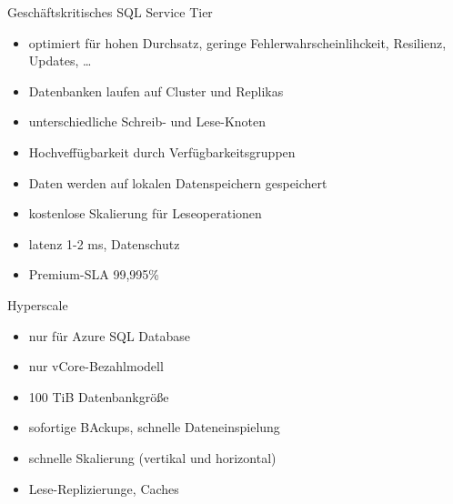 \begin{flashcard}[Definition]{Geschäftskritisches SQL Service Tier}
  \begin{itemize}
    \item optimiert für hohen Durchsatz, geringe Fehlerwahrscheinlihckeit, Resilienz, Updates, \ldots
    \item Datenbanken laufen auf Cluster und Replikas
    \item unterschiedliche Schreib- und Lese-Knoten
    \item Hochveffügbarkeit durch Verfügbarkeitsgruppen
    \item Daten werden auf lokalen Datenspeichern gespeichert
    \item kostenlose Skalierung für Leseoperationen
    \item latenz 1-2 ms, Datenschutz
    \item Premium-SLA 99,995\%
  \end{itemize}
\end{flashcard}

\begin{flashcard}[Definition]{Hyperscale}
  \begin{itemize}
    \item nur für Azure SQL Database
    \item nur vCore-Bezahlmodell
    \item 100 TiB Datenbankgröße
    \item sofortige BAckups, schnelle Dateneinspielung
    \item schnelle Skalierung (vertikal und horizontal)
    \item Lese-Replizierunge, Caches
  \end{itemize}
\end{flashcard}


